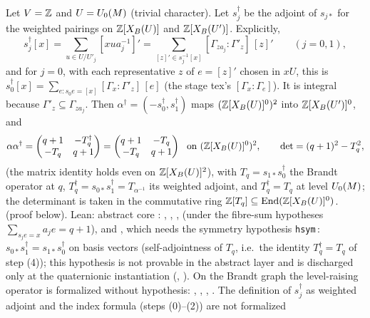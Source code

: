 \begin{proposition}\label{prop:s03-LRdef}
Let $V=\mathbb{Z}$ and $U=U_0(M)$ (trivial character). Let $s_j^\dagger$ be the adjoint of $s_{j*}$ for the weighted pairings on
$\mathbb{Z}[X_B(U)]$ and $\mathbb{Z}[X_B(U')]$. Explicitly,
\[s_j^\dagger[x]=\sum_{u\in U/U'_j}[xua_j^{-1}]'=\sum_{[z]'\in s_j^{-1}[x]}[\Gamma_{za_j}:\Gamma'_z]\,[z]'\qquad(j=0,1),\]
and for $j=0$, with each representative $z$ of $e=[z]'$ chosen in $xU$, this is $s_0^\dagger[x]=\sum_{e:s_0e=[x]}[\Gamma_x:\Gamma'_z]\,[e]$ (the stage tex's
$[\Gamma_x:\Gamma_e]$). It is integral because $\Gamma'_z\subseteq\Gamma_{za_j}$. Then $\alpha^\dagger=(-s_0^\dagger,s_1^\dagger)$ maps $(\mathbb{Z}[X_B(U)]^0)^2$ into $\mathbb{Z}[X_B(U')]^0$, and
\[\alpha\alpha^\dagger=\begin{pmatrix}q+1&-T_q^\dagger\\-T_q&q+1\end{pmatrix}=\begin{pmatrix}q+1&-T_q\\-T_q&q+1\end{pmatrix}\ \text{ on }(\Z[\XB U]^0)^2,
\qquad\det=(q+1)^2-T_q^2,\]
(the matrix identity holds even on $\mathbb{Z}[X_B(U)]^2$),
with $T_q=s_{1*}s_0^\dagger$ the Brandt operator at $q$, $T_q^\dagger=s_{0*}s_1^\dagger=T_{\alpha^{-1}}$ its weighted adjoint, and $T_q^\dagger=T_q$ at level
$U_0(M)$; the determinant is taken in the commutative ring $\mathbb{Z}[T_q]\subseteq\operatorname{End}(\mathbb{Z}[X_B(U)]^0)$. \stproved{} (proof below). Lean: abstract core \stformal{}: , , ,
 (under the fibre-sum hypotheses $\sum_{s_je=x}a_je=q+1$), and
, which needs the symmetry hypothesis \texttt{hsym}\,: $s_{0*}s_1^\dagger=s_{1*}s_0^\dagger$ on basis vectors (self-adjointness of $T_q$, i.e.\ the identity
$T_q^\dagger=T_q$ of step (4)); this hypothesis is not provable in the abstract layer and is discharged only at the quaternionic instantiation (,  \stformal{}). On the Brandt graph the level-raising operator is formalized without hypothesis: , , ,  \stformal{}. The definition of $s_j^\dagger$ as weighted adjoint and the index formula (steps (0)--(2)) are not formalized


\end{proposition}

